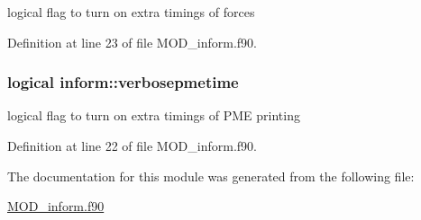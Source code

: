logical flag to turn on extra timings of forces 



Definition at line 23 of file M\-O\-D\-\_\-inform.\-f90.

\hypertarget{classinform_aa4cad958901d1f0f5df25f60424ca0d2}{
\subsubsection[{verbosepmetime}]{\setlength{\rightskip}{0pt plus 5cm}logical inform\-::verbosepmetime}}\label{classinform_aa4cad958901d1f0f5df25f60424ca0d2}


logical flag to turn on extra timings of P\-M\-E printing 



Definition at line 22 of file M\-O\-D\-\_\-inform.\-f90.



The documentation for this module was generated from the following file\-:\begin{DoxyCompactItemize}
\item 
\hyperlink{MOD__inform_8f90}{M\-O\-D\-\_\-inform.\-f90}\end{DoxyCompactItemize}
